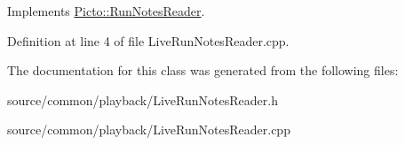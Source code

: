 Implements \hyperlink{class_picto_1_1_run_notes_reader_aa11971931900ca6456e1cd92891a2f05}{Picto\-::\-Run\-Notes\-Reader}.



Definition at line 4 of file Live\-Run\-Notes\-Reader.\-cpp.



The documentation for this class was generated from the following files\-:\begin{DoxyCompactItemize}
\item 
source/common/playback/Live\-Run\-Notes\-Reader.\-h\item 
source/common/playback/Live\-Run\-Notes\-Reader.\-cpp\end{DoxyCompactItemize}
